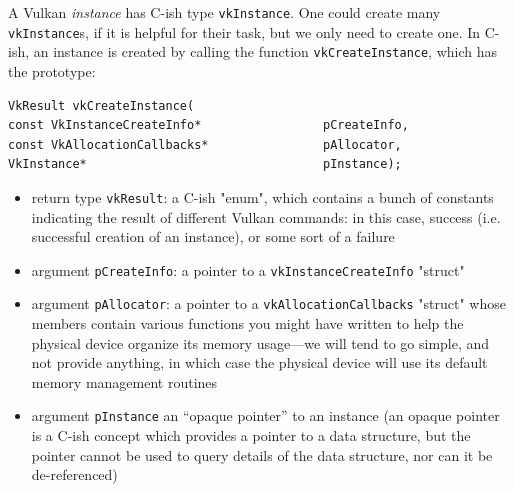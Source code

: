 \documentclass[12pt,letterpaper]{article}
\newcommand{\inquotes}[1]{``#1''}	%
\newcommand{\cil}[1]{\texttt{#1}}
\begin{document}
A Vulkan \emph{instance} has C-ish type \cil{vkInstance}. One could create many \cil{vkInstance}s, if it is helpful for their task, but we only need to create one. In C-ish, an instance is created by calling the function \cil{vkCreateInstance}, which has the prototype:
		\begin{verbatim}
VkResult vkCreateInstance(
const VkInstanceCreateInfo*                 pCreateInfo,
const VkAllocationCallbacks*                pAllocator,
VkInstance*                                 pInstance);
		\end{verbatim}
        
		\begin{itemize}
			\item return type \cil{vkResult}: a C-ish "enum", which contains a bunch of  constants indicating the result of different Vulkan commands: in this case, success (i.e. successful creation of an instance), or some sort of a failure
			
			\item argument \cil{pCreateInfo}: a pointer to a \cil{vkInstanceCreateInfo} "struct"
			
			\item argument \cil{pAllocator}: a pointer to a \cil{vkAllocationCallbacks} "struct" whose members contain various functions you might have written to help the physical device organize its memory usage---we will tend to go simple, and not provide anything, in which case the physical device will use its default memory management routines
			
			\item argument \cil{pInstance} an \inquotes{opaque pointer} to an instance (an opaque pointer is a C-ish concept which provides a pointer to a data structure, but the pointer cannot be used to query details of the data structure, nor can it be de-referenced)
		\end{itemize}
\end{document}
